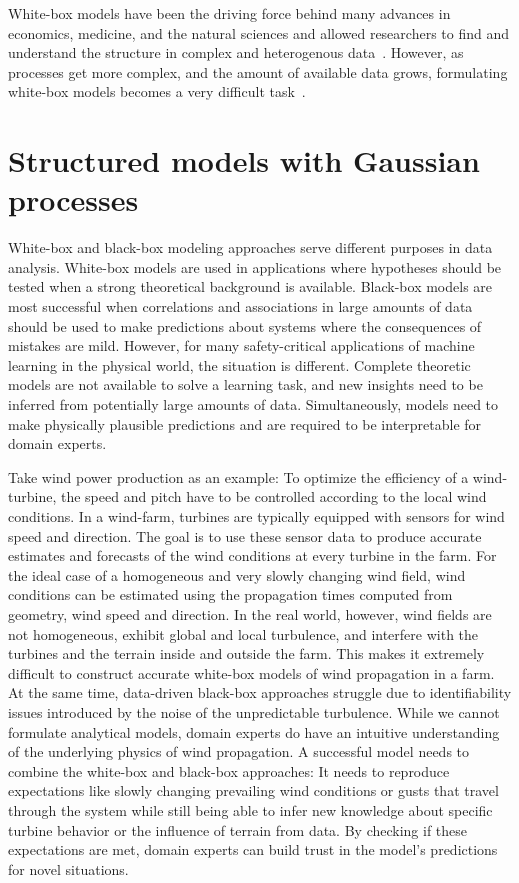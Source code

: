 White-box models have been the driving force behind many advances in economics, medicine, and the natural sciences and allowed researchers to find and understand the structure in complex and heterogenous data~\parencite{efron_modern_2005,giulio_d._agostini_bayesian_2003}.
However, as processes get more complex, and the amount of available data grows, formulating white-box models becomes a very difficult task~\parencite{sutton_bitter_2019}.


\section{Structured models with Gaussian processes}
White-box and black-box modeling approaches serve different purposes in data analysis.
White-box models are used in applications where hypotheses should be tested when a strong theoretical background is available.
Black-box models are most successful when correlations and associations in large amounts of data should be used to make predictions about systems where the consequences of mistakes are mild.
However, for many safety-critical applications of machine learning in the physical world, the situation is different.
Complete theoretic models are not available to solve a learning task, and new insights need to be inferred from potentially large amounts of data.
Simultaneously, models need to make physically plausible predictions and are required to be interpretable for domain experts.

Take wind power production as an example:
To optimize the efficiency of a wind-turbine, the speed and pitch have to be controlled according to the local wind conditions.
In a wind-farm, turbines are typically equipped with sensors for wind speed and direction.
The goal is to use these sensor data to produce accurate estimates and forecasts of the wind conditions at every turbine in the farm.
For the ideal case of a homogeneous and very slowly changing wind field, wind conditions can be estimated using the propagation times computed from geometry, wind speed and direction.
In the real world, however, wind fields are not homogeneous, exhibit global and local turbulence, and interfere with the turbines and the terrain inside and outside the farm.
This makes it extremely difficult to construct accurate white-box models of wind propagation in a farm.
At the same time, data-driven black-box approaches struggle due to identifiability issues introduced by the noise of the unpredictable turbulence.
While we cannot formulate analytical models, domain experts do have an intuitive understanding of the underlying physics of wind propagation.
A successful model needs to combine the white-box and black-box approaches:
It needs to reproduce expectations like slowly changing prevailing wind conditions or gusts that travel through the system while still being able to infer new knowledge about specific turbine behavior or the influence of terrain from data.
By checking if these expectations are met, domain experts can build trust in the model's predictions for novel situations.

